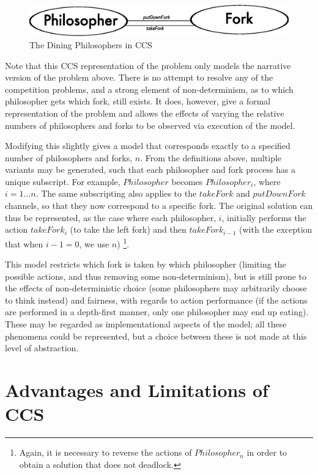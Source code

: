 \begin{figure}  
  \centering
  \includegraphics[scale=0.5]{philosophers}
  \caption{The Dining Philosophers in CCS}
  \label{fig:dpccs}
\end{figure}

Note that this CCS representation of the problem only models the
narrative version of the problem above.  There is no attempt to
resolve any of the competition problems, and a strong element of
non-determinism, as to which philosopher gets which fork, still
exists.  It does, however, give a formal representation of the problem
and allows the effects of varying the relative numbers of philosophers
and forks to be observed via execution of the model.

Modifying this slightly gives a model that corresponds
exactly to a specified number of philosophers and forks, $n$.  From
the definitions above, multiple variants may be generated, such that
each philosopher and fork process has a unique subscript.  For
example, $Philosopher$ becomes $Philosopher_i$, where $i = 1\dots n$.
The same subscripting also applies to the $takeFork$ and $putDownFork$
channels, so that they now correspond to a specific fork.  The
original solution can thus be represented, as the case where each
philosopher, $i$, initially performs the action $takeFork_i$ (to take
the left fork) and then $takeFork_{i-1}$ (with the exception that when
$i-1 = 0$, we use $n$) \footnote{Again, it is necessary to reverse the
  actions of $Philosopher_n$ in order to obtain a solution that does not
  deadlock.}.

This model restricts which fork is taken by which philosopher
(limiting the possible actions, and thus removing some
non-determinism), but is still prone to the effects of
non-deterministic choice (some philosophers may arbitrarily choose to
think instead) and fairness, with regards to action performance (if
the actions are performed in a depth-first manner, only one
philosopher may end up eating).  These may be regarded as
implementational aspects of the model; all these phenomena could be
represented, but a choice between these is not made at this level of
abstraction.

\section{Advantages and Limitations of CCS}
\label{ccslimit}

